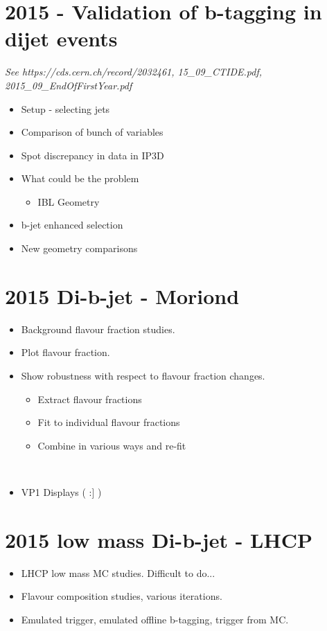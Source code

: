 \section{2015 - Validation of b-tagging in dijet events}
\textit{See https://cds.cern.ch/record/2032461, 15\_09\_CTIDE.pdf, 2015\_09\_EndOfFirstYear.pdf }
\begin{itemize}
\item{Setup - selecting jets}
\item{Comparison of bunch of variables}
\item{Spot discrepancy in data in IP3D}
\item{What could be the problem}
  \begin{itemize}[label={$-$}]
  \item{IBL Geometry}
  \end{itemize}
\item{b-jet enhanced selection}
\item{New geometry comparisons}
\end{itemize}

\section{2015 Di-b-jet - Moriond}
\begin{itemize}
\item{Background flavour fraction studies.}
\item{Plot flavour fraction.}
\item{Show robustness with respect to flavour fraction changes.}  
  \begin{itemize}[label={$-$}]
  \item{Extract flavour fractions}
  \item{Fit to individual flavour fractions}
  \item{Combine in various ways and re-fit}
  \end{itemize}
\\
\item{VP1 Displays ( :] )}
\end{itemize}

\section{2015 low mass Di-b-jet - LHCP}

\begin{itemize}
\item{LHCP low mass MC studies. Difficult to do...}
\item{Flavour composition studies, various iterations.}
\item{Emulated trigger, emulated offline b-tagging, trigger from MC.}
\end{itemize}

